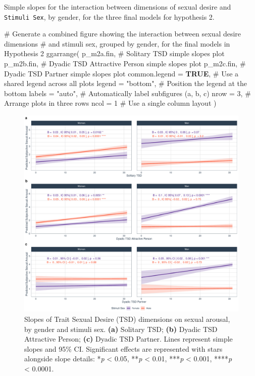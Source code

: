 \documentclass[
  bookmarksnumbered]{article}
\newenvironment{Shaded}{\begin{snugshade}}{\end{snugshade}}
\newcommand{\AttributeTok}[1]{\textcolor[rgb]{0.80,0.80,0.80}{#1}}
\newcommand{\CommentTok}[1]{\textcolor[rgb]{0.50,0.62,0.50}{#1}}
\newcommand{\ConstantTok}[1]{\textcolor[rgb]{0.86,0.64,0.64}{\textbf{#1}}}
\newcommand{\DecValTok}[1]{\textcolor[rgb]{0.86,0.86,0.80}{#1}}
\newcommand{\FunctionTok}[1]{\textcolor[rgb]{0.94,0.94,0.56}{#1}}
\newcommand{\NormalTok}[1]{\textcolor[rgb]{0.80,0.80,0.80}{#1}}
\newcommand{\StringTok}[1]{\textcolor[rgb]{0.80,0.58,0.58}{#1}}
\begin{document}
Simple slopes for the interaction between dimensions of sexual desire and \texttt{Stimuli\ Sex}, by gender, for the three final models for hypothesis 2.

\begin{Shaded}
\begin{Highlighting}[]
\CommentTok{\# Generate a combined figure showing the interaction between sexual desire dimensions}
\CommentTok{\# and stimuli sex, grouped by gender, for the final models in Hypothesis 2}
\FunctionTok{ggarrange}\NormalTok{(}
\NormalTok{  p\_m2a.fin, }\CommentTok{\# Solitary TSD simple slopes plot}
\NormalTok{  p\_m2b.fin, }\CommentTok{\# Dyadic TSD Attractive Person simple slopes plot}
\NormalTok{  p\_m2c.fin, }\CommentTok{\# Dyadic TSD Partner simple slopes plot}
  \AttributeTok{common.legend =} \ConstantTok{TRUE}\NormalTok{, }\CommentTok{\# Use a shared legend across all plots}
  \AttributeTok{legend =} \StringTok{"bottom"}\NormalTok{, }\CommentTok{\# Position the legend at the bottom}
  \AttributeTok{labels =} \StringTok{"auto"}\NormalTok{, }\CommentTok{\# Automatically label subfigures (a, b, c)}
  \AttributeTok{nrow =} \DecValTok{3}\NormalTok{, }\CommentTok{\# Arrange plots in three rows}
  \AttributeTok{ncol =} \DecValTok{1} \CommentTok{\# Use a single column layout}
\NormalTok{)}
\end{Highlighting}
\end{Shaded}

\begin{figure}
\centering
\includegraphics{Sexual_Desire_Arousal_anonymous_files/figure-latex/fig-m2-fin-1.pdf}
\caption{\label{fig:fig-m2-fin}Slopes of Trait Sexual Desire (TSD) dimensions on sexual arousal, by gender and stimuli sex. \textbf{(a)} Solitary TSD; \textbf{(b)} Dyadic TSD Attractive Person; \textbf{(c)} Dyadic TSD Partner. Lines represent simple slopes and 95\% CI. Significant effects are represented with stars alongside slope details: *\emph{p} \textless{} 0.05, **\emph{p} \textless{} 0.01, ***\emph{p} \textless{} 0.001, ****\emph{p} \textless{} 0.0001.}
\end{figure}
\end{document}
